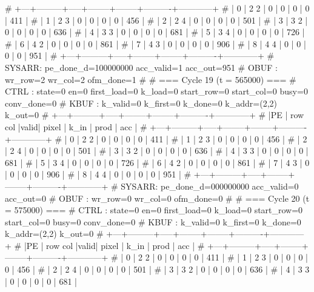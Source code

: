 # +---+---------+-----+--------+--------+----------+------------+
# | 0 |   2   2 |  0  |      0 |      0 |        0 |        411 |
# | 1 |   2   3 |  0  |      0 |      0 |        0 |        456 |
# | 2 |   2   4 |  0  |      0 |      0 |        0 |        501 |
# | 3 |   3   2 |  0  |      0 |      0 |        0 |        636 |
# | 4 |   3   3 |  0  |      0 |      0 |        0 |        681 |
# | 5 |   3   4 |  0  |      0 |      0 |        0 |        726 |
# | 6 |   4   2 |  0  |      0 |      0 |        0 |        861 |
# | 7 |   4   3 |  0  |      0 |      0 |        0 |        906 |
# | 8 |   4   4 |  0  |      0 |      0 |        0 |        951 |
# +---+---------+-----+--------+--------+----------+------------+
# SYSARR: pe_done_d=100000000 acc_valid=1 acc_out=951
# OBUF : wr_row=2 wr_col=2 ofm_done=1
# 
# === Cycle 19  (t = 565000) ===
# CTRL : state=0 en=0 first_load=0 k_load=0 start_row=0 start_col=0 busy=0 conv_done=0
# KBUF : k_valid=0 k_first=0 k_done=0 k_addr=(2,2) k_out=0
# +---+---------+-----+--------+--------+----------+------------+
# |PE | row col |valid| pixel  |  k_in  |   prod   |    acc     |
# +---+---------+-----+--------+--------+----------+------------+
# | 0 |   2   2 |  0  |      0 |      0 |        0 |        411 |
# | 1 |   2   3 |  0  |      0 |      0 |        0 |        456 |
# | 2 |   2   4 |  0  |      0 |      0 |        0 |        501 |
# | 3 |   3   2 |  0  |      0 |      0 |        0 |        636 |
# | 4 |   3   3 |  0  |      0 |      0 |        0 |        681 |
# | 5 |   3   4 |  0  |      0 |      0 |        0 |        726 |
# | 6 |   4   2 |  0  |      0 |      0 |        0 |        861 |
# | 7 |   4   3 |  0  |      0 |      0 |        0 |        906 |
# | 8 |   4   4 |  0  |      0 |      0 |        0 |        951 |
# +---+---------+-----+--------+--------+----------+------------+
# SYSARR: pe_done_d=000000000 acc_valid=0 acc_out=0
# OBUF : wr_row=0 wr_col=0 ofm_done=0
# 
# === Cycle 20  (t = 575000) ===
# CTRL : state=0 en=0 first_load=0 k_load=0 start_row=0 start_col=0 busy=0 conv_done=0
# KBUF : k_valid=0 k_first=0 k_done=0 k_addr=(2,2) k_out=0
# +---+---------+-----+--------+--------+----------+------------+
# |PE | row col |valid| pixel  |  k_in  |   prod   |    acc     |
# +---+---------+-----+--------+--------+----------+------------+
# | 0 |   2   2 |  0  |      0 |      0 |        0 |        411 |
# | 1 |   2   3 |  0  |      0 |      0 |        0 |        456 |
# | 2 |   2   4 |  0  |      0 |      0 |        0 |        501 |
# | 3 |   3   2 |  0  |      0 |      0 |        0 |        636 |
# | 4 |   3   3 |  0  |      0 |      0 |        0 |        681 |
